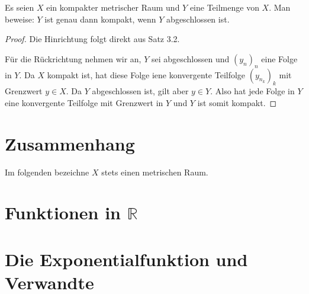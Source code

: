 \begin{aufgabe}
	Es seien $X$ ein kompakter metrischer Raum und $Y$ eine Teilmenge von $X$. Man beweise:
	$Y$ ist genau dann kompakt, wenn $Y$ abgeschlossen ist.
\end{aufgabe}
\begin{proof}
	Die Hinrichtung folgt direkt aus Satz 3.2.

	Für die Rückrichtung nehmen wir an, $Y$ sei abgeschlossen und $(y_n)_n$ eine Folge in $Y$.
	Da $X$ kompakt ist, hat diese Folge iene konvergente Teilfolge $(y_{n_k})_k$ mit Grenzwert
	$y \in X$. Da $Y$ abgeschlossen ist, gilt aber $y \in Y$. Also hat jede Folge in $Y$
	eine konvergente Teilfolge mit Grenzwert in $Y$ und $Y$ ist somit kompakt.
\end{proof}


\section{Zusammenhang}
Im folgenden bezeichne $X$ stets einen metrischen Raum.

\section{Funktionen in $\mathbb R$}
\section{Die Exponentialfunktion und Verwandte}
